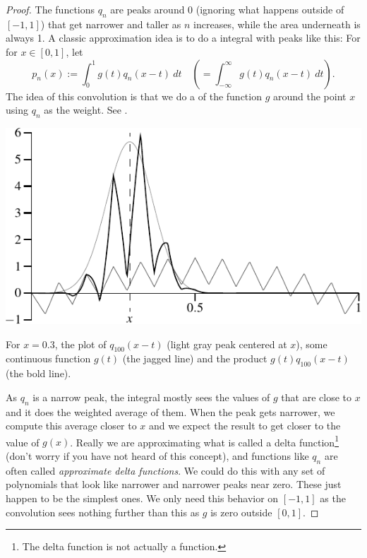 \begin{proof}
The functions $q_n$ are peaks around 0 (ignoring what happens outside
of $[-1,1]$) that get narrower and taller as $n$ increases,
while the area underneath is always 1.
A classic approximation idea
is to do a \emph{} integral with peaks like this:
For
for $x \in [0,1]$, let
\begin{equation*}
p_n(x) := \int_{0}^1 g(t)q_n(x-t) ~dt \quad \left( = \int_{-\infty}^\infty
g(t)q_n(x-t) ~dt \right) .
\end{equation*}
The idea of this convolution is that we do a  of the
function $g$ around the point $x$ using $q_n$ as the weight.
See .

\begin{myfigureht}
\includegraphics{figures/approxdeltaconv}
\caption{For $x=0.3$, the plot of $q_{100}(x-t)$ (light gray peak centered
at $x$), some continuous function
$g(t)$ (the jagged line) and the product $g(t)q_{100}(x-t)$ (the bold line).\label{fig:approxdeltaconv}}
\end{myfigureht}

As $q_n$ is a narrow peak, the integral
mostly sees the values of $g$ that are
close to $x$ and it does the weighted average of them.
When the peak gets narrower, we compute this average closer to $x$
and we expect the result to get closer to the value of $g(x)$.  Really we are
approximating what is called a delta function\footnote{The delta function
is not actually a function.} (don't worry if you have not
heard of this concept),
and functions like $q_n$ are often called
\emph{approximate delta functions}.
We could do this with any set of polynomials that look like narrower
and narrower peaks near zero.  These just happen to be the simplest ones.
We only need this behavior on $[-1,1]$ as the convolution sees nothing
further than this as $g$ is zero outside $[0,1]$.


\end{proof}

